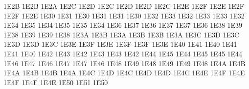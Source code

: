 \setcclcucx 1E2B 1E2B 1E2A %
\setcclcucx 1E2C 1E2D 1E2C %
\setcclcucx 1E2D 1E2D 1E2C %
\setcclcucx 1E2E 1E2F 1E2E %
\setcclcucx 1E2F 1E2F 1E2E %
\setcclcucx 1E30 1E31 1E30 %
\setcclcucx 1E31 1E31 1E30 %
\setcclcucx 1E32 1E33 1E32 %
\setcclcucx 1E33 1E33 1E32 %
\setcclcucx 1E34 1E35 1E34 %
\setcclcucx 1E35 1E35 1E34 %
\setcclcucx 1E36 1E37 1E36 %
\setcclcucx 1E37 1E37 1E36 %
\setcclcucx 1E38 1E39 1E38 %
\setcclcucx 1E39 1E39 1E38 %
\setcclcucx 1E3A 1E3B 1E3A %
\setcclcucx 1E3B 1E3B 1E3A %
\setcclcucx 1E3C 1E3D 1E3C %
\setcclcucx 1E3D 1E3D 1E3C %
\setcclcucx 1E3E 1E3F 1E3E %
\setcclcucx 1E3F 1E3F 1E3E %
\setcclcucx 1E40 1E41 1E40 %
\setcclcucx 1E41 1E41 1E40 %
\setcclcucx 1E42 1E43 1E42 %
\setcclcucx 1E43 1E43 1E42 %
\setcclcucx 1E44 1E45 1E44 %
\setcclcucx 1E45 1E45 1E44 %
\setcclcucx 1E46 1E47 1E46 %
\setcclcucx 1E47 1E47 1E46 %
\setcclcucx 1E48 1E49 1E48 %
\setcclcucx 1E49 1E49 1E48 %
\setcclcucx 1E4A 1E4B 1E4A %
\setcclcucx 1E4B 1E4B 1E4A %
\setcclcucx 1E4C 1E4D 1E4C %
\setcclcucx 1E4D 1E4D 1E4C %
\setcclcucx 1E4E 1E4F 1E4E %
\setcclcucx 1E4F 1E4F 1E4E %
\setcclcucx 1E50 1E51 1E50 %
